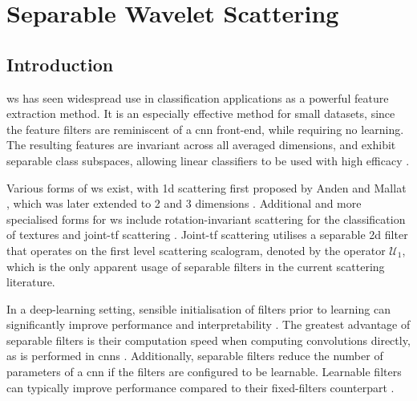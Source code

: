 
\chapter{Separable Wavelet Scattering}





\section{Introduction}
\Ac{ws} has seen widespread use in classification applications as a powerful feature extraction method. It is an especially effective method for small datasets, since the feature filters are reminiscent of a \ac{cnn} front-end, while requiring no learning. The resulting features are invariant across all averaged dimensions, and exhibit separable class subspaces, allowing linear classifiers to be used with high efficacy \citep{2dscattering}.

Various forms of \ac{ws} exist, with \ac{1d} scattering first proposed by Anden and Mallat \citep{1dscattering1, ws}, which was later extended to 2 \citep{2dscattering} and 3 dimensions \citep{3dscattering, harmonicscattering}. Additional and more specialised forms for \ac{ws} include rotation-invariant scattering \citep{groupinvariantscattering} for the classification of textures and joint-\ac{tf} scattering \citep{ws_joint_tf, jointtfscattering2}. Joint-\ac{tf} scattering utilises a separable \ac{2d} filter that operates on the first level scattering scalogram, denoted by the operator $\mathcal{U}_1$, which is the only apparent usage of separable filters in the current scattering literature. 

In a deep-learning setting, sensible initialisation of filters prior to learning can significantly improve performance and interpretability \citep{sincnet}. The greatest advantage of separable filters is their computation speed when computing convolutions directly, as is performed in \acp{cnn} \citep{separablecnn}. Additionally, separable filters reduce the number of parameters of a \ac{cnn} if the filters are configured to be learnable. Learnable filters can typically improve performance compared to their fixed-filters counterpart \citep{scattering_birdsong}. 

